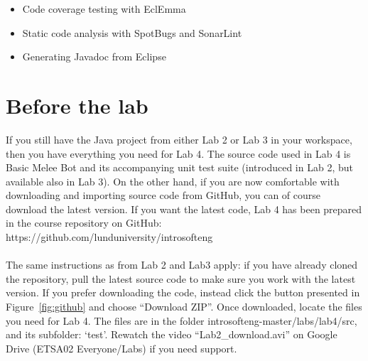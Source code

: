 \documentclass{scrreprt}
\begin{document}
\begin{itemize}
\item Code coverage testing with EclEmma
\item Static code analysis with SpotBugs and SonarLint
\item Generating Javadoc from Eclipse
\end{itemize}

\chapter{Before the lab}
If you still have the Java project from either Lab 2 or Lab 3 in your workspace, then you have everything you need for Lab 4. The source code used in Lab 4 is Basic Melee Bot and its accompanying unit test suite (introduced in Lab 2, but available also in Lab 3). On the other hand, if you are now comfortable with downloading and importing source code from GitHub, you can of course download the latest version. If you want the latest code, Lab 4 has been prepared in the course repository on GitHub:\\https://github.com/lunduniversity/introsofteng\\\\
The same instructions as from Lab 2 and Lab3 apply: if you have already cloned the repository, pull the latest source code to make sure you work with the latest version. If you prefer downloading the code, instead click the button presented in Figure~\ref{fig:github} and choose ``Download ZIP''. Once downloaded, locate the files you need for Lab 4. The files are in the folder introsofteng-master/labs/lab4/src, and its subfolder: `test'. Rewatch the video ``Lab2_download.avi'' on Google Drive (ETSA02 Everyone/Labs) if you need support.
\end{document}
